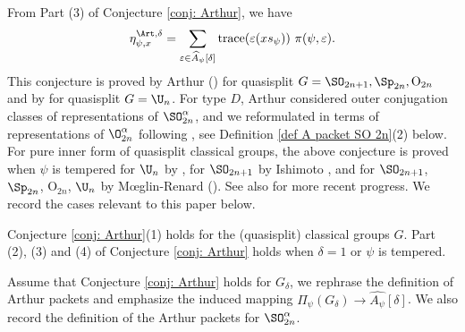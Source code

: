 \documentclass[11pt,letterpaper]{amsart}
\numberwithin{equation}{section}
\begin{document}
From Part (3) of Conjecture \ref{conj: Arthur}, we have
        \[ 
        \eta_{\psi,x}^{\Art, \delta}= \sum_{\varepsilon \in \widehat{A}_{\psi}[\delta]} \mathrm{trace}(\varepsilon(x s_\psi))\ \pi(\psi, \varepsilon). \]
%
This conjecture is proved by Arthur (\cite{Art13}) for quasisplit $G=\SO_{2n+1}, \Sp_{2n}, \mathrm{O}_{2n}$ and by \cite{Mok15} for quasisplit $G=\U_n$. For type $D$, Arthur considered outer conjugation classes of representations of $\SO^{\alpha}_{2n}$, and we reformulated in terms of representations of $\O_{2n}^{\alpha}$ following  \cite{AG17}, see Definition \ref{def A packet SO 2n}(2) below.
For pure inner form of quasisplit classical groups, the above conjecture is proved when $\psi$ is tempered for $\U_n$ by \cite{KMSW14}, for $\SO_{2n+1}$ by Ishimoto \cite{Ish24}, and for $\SO_{2n+1}$, $\Sp_{2n}$, $\mathrm{O}_{2n}$, $\U_n$ by M{\oe}glin-Renard (\cite{MR18}). 
See also \cite{Pen25} for more recent progress. We record the cases relevant to this paper below.

\begin{theorem}\label{thm Arthur's theory for quasisplit and tempered}
Conjecture \ref{conj: Arthur}(1) holds for the (quasisplit) classical groups $G$. Part (2), (3) and (4) of Conjecture \ref{conj: Arthur} holds when $\delta=1$ or $\psi$ is tempered.
\end{theorem}


Assume that Conjecture \ref{conj: Arthur} holds for $G_{\delta}$, we rephrase the definition of Arthur packets and emphasize the induced mapping $\Pi_{\psi}(G_{\delta}) \to \widehat{A_{\psi}}[\delta]$. We also record the definition of the Arthur packets for $\SO_{2n}^{\alpha}$.
\end{document}
